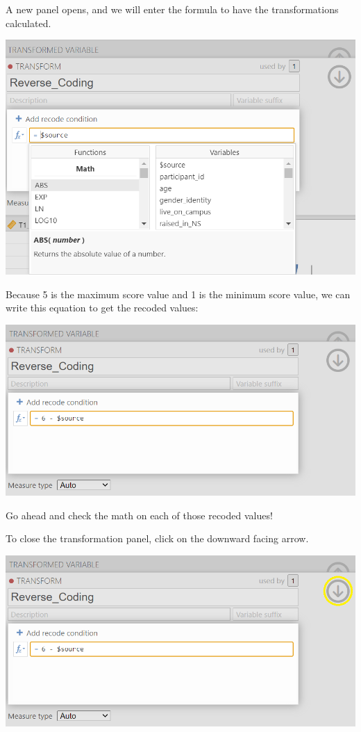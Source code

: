 \documentclass[
]{book}
\begin{document}
A new panel opens, and we will enter the formula to have the transformations calculated.

\includegraphics{img/StressScale_TransformationToRecodeT1Stress4_4.png}

Because 5 is the maximum score value and 1 is the minimum score value, we can write this equation to get the recoded values:

\includegraphics{img/StressScale_TransformationToRecodeT1Stress4_5.png}

Go ahead and check the math on each of those recoded values!

To close the transformation panel, click on the downward facing arrow.

\includegraphics{img/StressScale_TransformationToRecodeT1Stress4_6.png}
\end{document}
